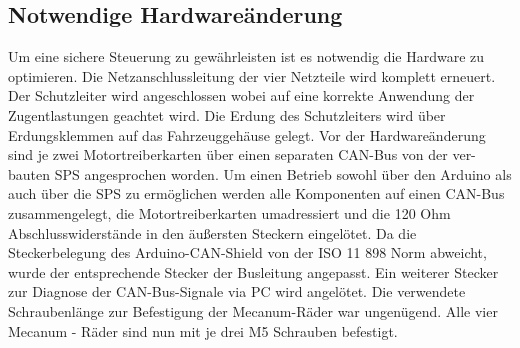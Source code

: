 \subsection{Notwendige Hardwareänderung}
Um eine sichere Steuerung zu gewährleisten ist es notwendig die Hardware zu optimieren.
Die Netzanschlussleitung der vier Netzteile wird komplett erneuert. Der Schutzleiter wird angeschlossen wobei auf eine korrekte Anwendung der Zugentlastungen geachtet wird. Die Erdung des Schutzleiters wird über Erdungsklemmen auf das Fahrzeuggehäuse gelegt.
Vor der Hardwareänderung sind je zwei Motortreiberkarten über einen separaten CAN-Bus von der ver-bauten SPS angesprochen worden. Um einen Betrieb sowohl über den Arduino als auch über die SPS zu ermöglichen werden alle Komponenten auf einen CAN-Bus zusammengelegt, die Motortreiberkarten umadressiert und die 120 Ohm Abschlusswiderstände in den äußersten Steckern eingelötet.
Da die Steckerbelegung des Arduino-CAN-Shield von der ISO 11 898 Norm abweicht, wurde der entsprechende Stecker der Busleitung angepasst. Ein weiterer Stecker zur Diagnose der CAN-Bus-Signale via PC wird angelötet.
Die verwendete Schraubenlänge zur Befestigung der Mecanum-Räder war ungenügend. Alle vier Mecanum - Räder sind nun mit je drei M5 Schrauben befestigt.